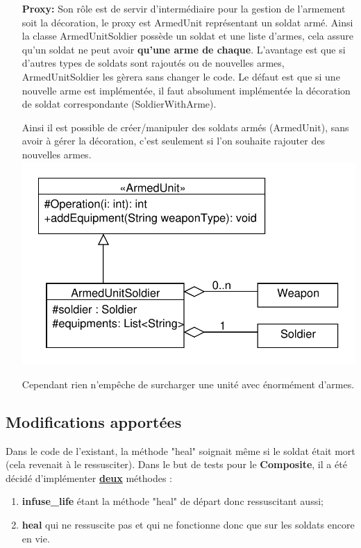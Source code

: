 \documentclass[12pt]{article}
\begin{document}
\begin{enumerate}
\item[\textbf{Proxy:}] Son rôle est de servir d'intermédiaire pour la gestion de
l'armement soit la décoration, le proxy est ArmedUnit représentant un soldat armé.
Ainsi la classe ArmedUnitSoldier possède un soldat et une liste d'armes,
cela assure qu'un soldat ne peut avoir \textbf{qu'une arme de chaque}.
L'avantage est que si d'autres types de soldats
sont rajoutés ou de nouvelles armes, ArmedUnitSoldier les gèrera sans changer le 
code. Le défaut est que si une nouvelle arme est implémentée, il faut absolument
implémentée la décoration de soldat correspondante (SoldierWith{Arme}).

Ainsi il est possible de créer/manipuler des soldats armés (ArmedUnit),
sans avoir à gérer la décoration, c'est seulement si l'on souhaite rajouter des nouvelles armes.
\includegraphics[scale=1]{../UML/Proxy}

Cependant rien n'empêche de surcharger une unité avec énormément d'armes.
\end{enumerate}
\subsection{Modifications apportées}
Dans le code de l'existant, la méthode "heal" soignait même si le soldat était mort (cela revenait à le ressusciter).
Dans le but de tests pour le \textbf{Composite}, il a été décidé d'implémenter \underline{\textbf{deux}} méthodes :
\begin{enumerate}
 \item \textbf{infuse\_life} étant la méthode "heal" de départ donc ressuscitant aussi;
 \item \textbf{heal} qui ne ressuscite pas et qui ne fonctionne donc que sur les soldats encore en vie.
\end{enumerate}
\end{document}
